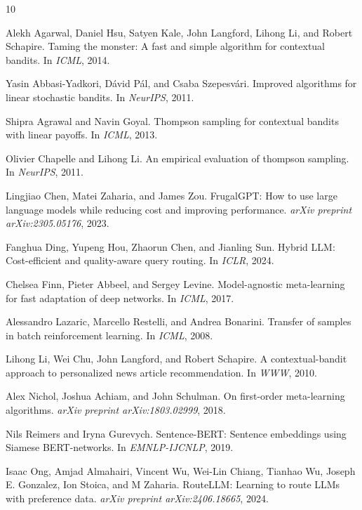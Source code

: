 \documentclass[sigconf,nonacm]{acmart}
\begin{document}

\begin{thebibliography}{10}

Alekh Agarwal, Daniel Hsu, Satyen Kale, John Langford, Lihong Li, and Robert Schapire.
\newblock Taming the monster: A fast and simple algorithm for contextual bandits.
\newblock In \emph{ICML}, 2014.

Yasin Abbasi-Yadkori, Dávid Pál, and Csaba Szepesvári.
\newblock Improved algorithms for linear stochastic bandits.
\newblock In \emph{NeurIPS}, 2011.

Shipra Agrawal and Navin Goyal.
\newblock Thompson sampling for contextual bandits with linear payoffs.
\newblock In \emph{ICML}, 2013.

Olivier Chapelle and Lihong Li.
\newblock An empirical evaluation of thompson sampling.
\newblock In \emph{NeurIPS}, 2011.

Lingjiao Chen, Matei Zaharia, and James Zou.
\newblock FrugalGPT: How to use large language models while reducing cost and improving performance.
\newblock \emph{arXiv preprint arXiv:2305.05176}, 2023.

Fanghua Ding, Yupeng Hou, Zhaorun Chen, and Jianling Sun.
\newblock Hybrid LLM: Cost-efficient and quality-aware query routing.
\newblock In \emph{ICLR}, 2024.

Chelsea Finn, Pieter Abbeel, and Sergey Levine.
\newblock Model-agnostic meta-learning for fast adaptation of deep networks.
\newblock In \emph{ICML}, 2017.

Alessandro Lazaric, Marcello Restelli, and Andrea Bonarini.
\newblock Transfer of samples in batch reinforcement learning.
\newblock In \emph{ICML}, 2008.

Lihong Li, Wei Chu, John Langford, and Robert Schapire.
\newblock A contextual-bandit approach to personalized news article recommendation.
\newblock In \emph{WWW}, 2010.

Alex Nichol, Joshua Achiam, and John Schulman.
\newblock On first-order meta-learning algorithms.
\newblock \emph{arXiv preprint arXiv:1803.02999}, 2018.

Nils Reimers and Iryna Gurevych.
\newblock Sentence-BERT: Sentence embeddings using Siamese BERT-networks.
\newblock In \emph{EMNLP-IJCNLP}, 2019.

Isaac Ong, Amjad Almahairi, Vincent Wu, Wei-Lin Chiang, Tianhao Wu, Joseph E. Gonzalez, Ion Stoica, and M Zaharia.
\newblock RouteLLM: Learning to route LLMs with preference data.
\newblock \emph{arXiv preprint arXiv:2406.18665}, 2024.

\end{thebibliography}
\end{document}
